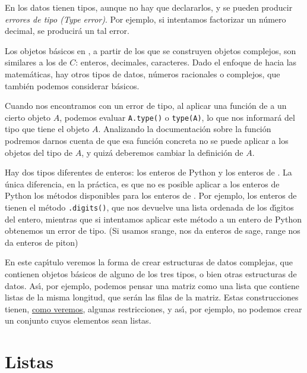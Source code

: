 En {\sage} los datos tienen tipos, aunque no hay que declararlos, y se pueden
producir {\itshape errores de tipo (Type error)}. Por ejemplo, si intentamos
factorizar un n\'umero decimal, se producir\'a un tal error.  





Los objetos b\'asicos en {\sage}, a partir de los que se construyen objetos
complejos, son similares a los de $C$: enteros, decimales, caracteres. Dado el
enfoque de {\sage} hacia las matem\'aticas, hay otros tipos de datos, n\'umeros
racionales o complejos, que tambi\'en podemos considerar b\'asicos.

Cuando nos encontramos con un error de tipo, al aplicar una funci\'on de
{\sage} a un cierto objeto $A$, podemos evaluar \lstinline|A.type()| o
\lstinline|type(A)|, lo que nos informar\'a del tipo que tiene el objeto $A$.
Analizando la documentaci\'on sobre la funci\'on podremos darnos cuenta de que
esa funci\'on concreta no se puede aplicar a los objetos del tipo de $A$, y
quiz\'a deberemos cambiar la definici\'on de $A$. 

\label{enteros}

Hay dos tipos diferentes de enteros: los enteros de Python y los enteros de
{\sage}. La \'unica diferencia, en la pr\'actica,  es que no es posible aplicar
a los enteros de Python los m\'etodos disponibles para los enteros de {\sage}.
Por ejemplo, los enteros de {\sage} tienen el m\'etodo \lstinline|.digits()|,
que nos devuelve una lista ordenada de los d\'{\i}gitos del entero, mientras que
si intentamos aplicar este m\'etodo a un entero de Python obtenemos un error de
tipo.  (Si usamos srange, nos da enteros de sage, range nos da enteros de piton)

En este
cap\'{\i}tulo veremos la forma de crear estructuras de datos complejas, que
contienen objetos b\'asicos de alguno de los tres tipos, o bien otras
estructuras de datos.  As\'{\i}, por ejemplo, podemos pensar una matriz como
una lista que contiene listas de la misma longitud,  que ser\'an las filas de la
matriz. Estas construcciones tienen, \hyperref[unhash]{como veremos}, algunas
restricciones, y as\'{\i}, por ejemplo, no podemos crear un conjunto cuyos
elementos sean listas. 




\section{Listas}

